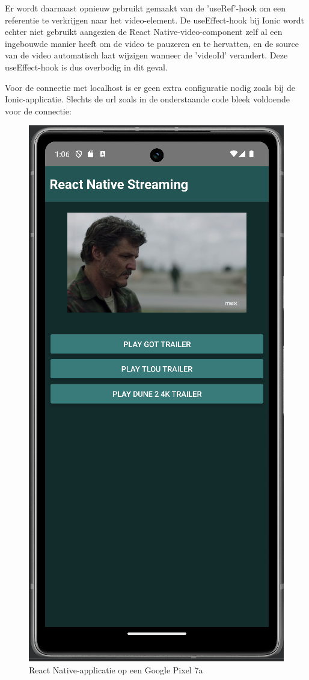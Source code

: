 Er wordt daarnaast opnieuw gebruikt gemaakt van de 'useRef'-hook om een referentie te verkrijgen naar het video-element. De useEffect-hook bij Ionic wordt echter niet gebruikt aangezien de React Native-video-component zelf al een ingebouwde manier heeft om de video te pauzeren en te hervatten, en de source van de video automatisch laat wijzigen wanneer de 'videoId' verandert. Deze useEffect-hook is dus overbodig in dit geval.

Voor de connectie met localhost is er geen extra configuratie nodig zoals bij de Ionic-applicatie. Slechts de url zoals in de onderstaande code bleek voldoende voor de connectie:

\begin{figure}
  \centering
  \includegraphics[width=0.7\linewidth]{img/ReactNativePhone}
  \caption{React Native-applicatie op een Google Pixel 7a}
  \label{fig:React Native-applicatie op een Google Pixel 7a}
\end{figure}

